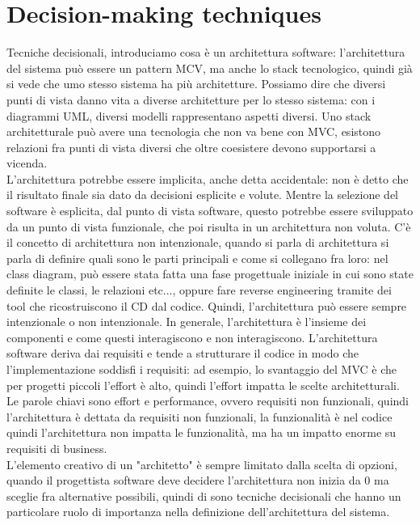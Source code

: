 \documentclass{article}
\begin{document}
\section{Decision-making techniques}
Tecniche decisionali, introduciamo cosa è un architettura software: l'architettura del sistema può essere un pattern MCV, ma anche lo stack tecnologico, quindi già si vede che umo stesso sistema ha più architetture. Possiamo dire che diversi punti di vista danno vita a diverse architetture per lo stesso sistema: con i diagrammi UML, diversi modelli rappresentano aspetti diversi. Uno stack architetturale può avere una tecnologia che non va bene con MVC, esistono relazioni fra punti di vista diversi che oltre coesistere devono supportarsi a vicenda.\\ L'architettura potrebbe essere implicita, anche detta accidentale: non è detto che il risultato finale sia dato da decisioni esplicite e volute. Mentre la selezione del software è esplicita, dal punto di vista software, questo potrebbe essere sviluppato da un punto di vista funzionale, che poi risulta in un architettura non voluta. C'è il concetto di architettura non intenzionale, quando si parla di architettura si parla di definire quali sono le parti principali e come si collegano fra loro: nel class diagram, può essere stata fatta una fase progettuale iniziale in cui sono state definite le classi, le relazioni etc..., oppure fare reverse engineering tramite dei tool che ricostruiscono il CD dal codice. Quindi, l'architettura può essere sempre intenzionale o non intenzionale. In generale, l'architettura è l'insieme dei componenti e come questi interagiscono e non interagiscono. L'architettura software deriva dai requisiti e tende a strutturare il codice in modo che l'implementazione soddisfi i requisiti: ad esempio, lo svantaggio del MVC è che per progetti piccoli l'effort è alto, quindi l'effort impatta le scelte architetturali. Le parole chiavi sono effort e performance, ovvero requisiti non funzionali, quindi l'architettura è dettata da requisiti non funzionali, la funzionalità è nel codice quindi l'architettura non impatta le funzionalità, ma ha un impatto enorme su requisiti di business.\\ L'elemento creativo di un "architetto" è sempre limitato dalla scelta di opzioni, quando il progettista software deve decidere l'architettura non inizia da 0 ma sceglie fra alternative possibili, quindi di sono tecniche decisionali che hanno un particolare ruolo di importanza nella definizione dell'architettura del sistema.
\end{document}
